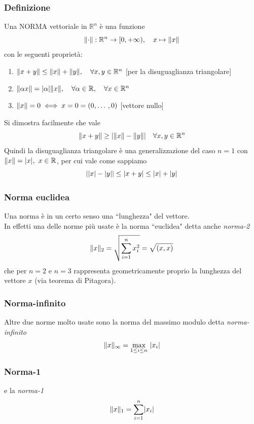 \documentclass[12pt,a4paper]{article}
\DeclarePairedDelimiter{\abs}{\lvert}{\rvert}
\DeclarePairedDelimiter{\norma}{\lVert}{\rVert}
\begin{document}
\subsubsection{Definizione}
Una NORMA vettoriale in $\mathbb{R}^n$ è una funzione
\[
\norma{\cdot} : \mathbb{R}^n \to [ 0, + \infty ), \quad x \mapsto \norma{x}
\]
con le seguenti proprietà:
\begin{enumerate}
    \item $\norma{x+y} \le \norma{x} + \norma{y}, \quad \forall x,y \in \mathbb{R}^n$ [per la disuguaglianza triangolare]
    
    \item $\norma{\alpha x} = \abs{\alpha} \norma{x}, \quad \forall \alpha \in \mathbb{R}, \quad \forall x \in \mathbb{R}^n$
    
    \item $\norma{x} = 0 \iff x = 0 = (0, \dotso , 0)$ [vettore nullo]
\end{enumerate}
Si dimostra facilmente che vale
\[
\norma{x+y} \ge \abs{\norma{x} - \norma{y}} \quad \forall x, y \in \mathbb{R}^n
\]
Quindi la disuguaglianza triangolare è una generalizzazione del caso $n=1$ con $\norma{x} = \abs{x}, \ x \in \mathbb{R}$, per cui vale come sappiamo
\[
\abs{\abs{x} - \abs{y}} \le \abs{x+y} \le \abs{x} + \abs{y}
\]

\subsubsection{Norma euclidea}
Una norma è in un certo senso una ``lunghezza" del vettore.\\
In effetti una delle norme più usate è la norma ``euclidea" detta anche \textit{norma-2}
\[
\norma{x}_2 = \sqrt{\sum_{i=1}^n x_i^2} = \sqrt{(x,x)}
\]
che per $n=2$ e $n=3$ rappresenta geometricamente proprio la lunghezza del vettore $x$ (via teorema di Pitagora).\\

\subsubsection{Norma-infinito}
Altre due norme molto usate sono la norma del massimo modulo detta \textit{norma-infinito}
\[
\norma{x}_\infty = \underset{1 \le i \le n}{\text{max}} \ \abs{x_i}
\]

\subsubsection{Norma-1}
e la \textit{norma-1}
\[
\norma{x}_1 = \sum_{i=1}^n \abs{x_i}
\]
\end{document}
